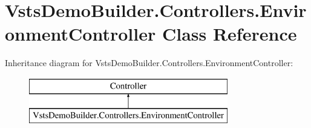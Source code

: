 \hypertarget{class_vsts_demo_builder_1_1_controllers_1_1_environment_controller}{}\section{Vsts\+Demo\+Builder.\+Controllers.\+Environment\+Controller Class Reference}
\label{class_vsts_demo_builder_1_1_controllers_1_1_environment_controller}
Inheritance diagram for Vsts\+Demo\+Builder.\+Controllers.\+Environment\+Controller\+:\begin{figure}[H]
\begin{center}
\leavevmode
\includegraphics[height=2.000000cm]{class_vsts_demo_builder_1_1_controllers_1_1_environment_controller}
\end{center}
\end{figure}
